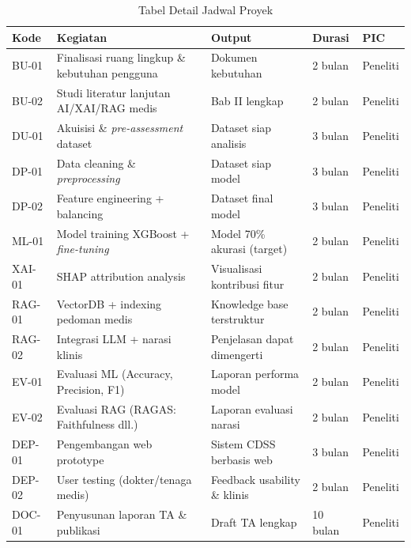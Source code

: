 \begin{table}[H]
    \caption{Tabel Detail Jadwal Proyek}
    \label{tab:jadwal-proyek}
    \centering
    \small
    \begin{tabular}{|p{1.5cm}|p{4.5cm}|p{3cm}|p{2cm}|p{2cm}|}
        \hline
        \textbf{Kode} & \textbf{Kegiatan} & \textbf{Output} & \textbf{Durasi} & \textbf{PIC} \\
        \hline
        BU-01 & Finalisasi ruang lingkup \& kebutuhan pengguna & Dokumen kebutuhan & 2 bulan & Peneliti \\
        \hline
        BU-02 & Studi literatur lanjutan AI/XAI/RAG medis & Bab II lengkap & 2 bulan & Peneliti \\
        \hline
        DU-01 & Akuisisi \& \textit{pre-assessment} dataset & Dataset siap analisis & 3 bulan & Peneliti \\
        \hline
        DP-01 & Data cleaning \& \textit{preprocessing} & Dataset siap model & 3 bulan & Peneliti \\
        \hline
        DP-02 & Feature engineering + balancing & Dataset final model & 3 bulan & Peneliti \\
        \hline
        ML-01 & Model training XGBoost + \textit{fine-tuning} & Model 70\% akurasi (target) & 2 bulan & Peneliti \\
        \hline
        XAI-01 & SHAP attribution analysis & Visualisasi kontribusi fitur & 2 bulan & Peneliti \\
        \hline
        RAG-01 & VectorDB + indexing pedoman medis & Knowledge base terstruktur & 2 bulan & Peneliti \\
        \hline
        RAG-02 & Integrasi LLM + narasi klinis & Penjelasan dapat dimengerti & 2 bulan & Peneliti \\
        \hline
        EV-01 & Evaluasi ML (Accuracy, Precision, F1) & Laporan performa model & 2 bulan & Peneliti \\
        \hline
        EV-02 & Evaluasi RAG (RAGAS: Faithfulness dll.) & Laporan evaluasi narasi & 2 bulan & Peneliti \\
        \hline
        DEP-01 & Pengembangan web prototype & Sistem CDSS berbasis web & 3 bulan & Peneliti \\
        \hline
        DEP-02 & User testing (dokter/tenaga medis) & Feedback usability \& klinis & 2 bulan & Peneliti \\
        \hline
        DOC-01 & Penyusunan laporan TA \& publikasi & Draft TA lengkap & 10 bulan & Peneliti \\
        \hline
    \end{tabular}
\end{table}


